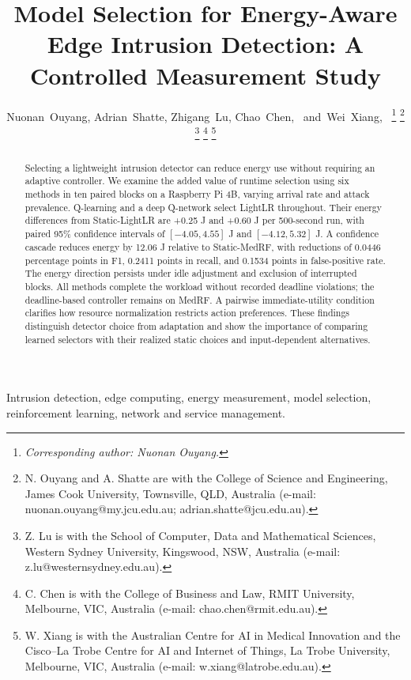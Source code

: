 \documentclass[journal]{IEEEtran}
\begin{document}
\title{Model Selection for Energy-Aware Edge Intrusion Detection: A Controlled Measurement Study}
\author{Nuonan~Ouyang, Adrian~Shatte, Zhigang~Lu, Chao~Chen,~ and~Wei~Xiang,~%
\thanks{\textit{Corresponding author: Nuonan Ouyang.}}%
\thanks{N. Ouyang and A. Shatte are with the College of Science and Engineering, James Cook University, Townsville, QLD, Australia (e-mail: nuonan.ouyang@my.jcu.edu.au; adrian.shatte@jcu.edu.au).}%
\thanks{Z. Lu is with the School of Computer, Data and Mathematical Sciences, Western Sydney University, Kingswood, NSW, Australia (e-mail: z.lu@westernsydney.edu.au).}%
\thanks{C. Chen is with the College of Business and Law, RMIT University, Melbourne, VIC, Australia (e-mail: chao.chen@rmit.edu.au).}%
\thanks{W. Xiang is with the Australian Centre for AI in Medical Innovation and the Cisco--La Trobe Centre for AI and Internet of Things, La Trobe University, Melbourne, VIC, Australia (e-mail: w.xiang@latrobe.edu.au).}}
\maketitle
\begin{abstract}
Selecting a lightweight intrusion detector can reduce energy use without requiring an adaptive controller. We examine the added value of runtime selection using six methods in ten paired blocks on a Raspberry Pi 4B, varying arrival rate and attack prevalence. Q-learning and a deep Q-network select LightLR throughout. Their energy differences from Static-LightLR are +0.25 J and +0.60 J per 500-second run, with paired 95\% confidence intervals of $[-4.05,4.55]$ J and $[-4.12,5.32]$ J. A confidence cascade reduces energy by 12.06 J relative to Static-MedRF, with reductions of 0.0446 percentage points in F1, 0.2411 points in recall, and 0.1534 points in false-positive rate. The energy direction persists under idle adjustment and exclusion of interrupted blocks. All methods complete the workload without recorded deadline violations; the deadline-based controller remains on MedRF. A pairwise immediate-utility condition clarifies how resource normalization restricts action preferences. These findings distinguish detector choice from adaptation and show the importance of comparing learned selectors with their realized static choices and input-dependent alternatives.
\end{abstract}
\begin{IEEEkeywords}
Intrusion detection, edge computing, energy measurement, model selection, reinforcement learning, network and service management.
\end{IEEEkeywords}
\end{document}

